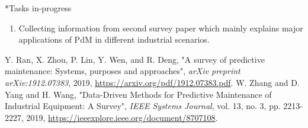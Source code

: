 \documentclass[11pt,a4paper]{article}
\begin{document}
\begin{section}
\begin{subsection}
\begin{enumerate}
    \end{enumerate}
\end{subsection}
\begin{subsection}*{Tasks in-progress}
    \begin{enumerate}
        \item
            Collecting information from second survey paper\cite{survey21} which mainly explains major applications of PdM in different industrial scenarios.
    \end{enumerate}
\end{subsection}
\begin{thebibliography}{9}
    {Y. Ran, X. Zhou, P. Lin, Y. Wen, and R. Deng},
    "A survey of predictive maintenance: Systems, purposes and approaches",
    \textit{arXiv preprint arXiv:1912.07383},
    2019,
    \href{https://arxiv.org/pdf/1912.07383.pdf}{https://arxiv.org/pdf/1912.07383.pdf}.
    {W. {Zhang} and D. {Yang} and H. {Wang}},
    "Data-Driven Methods for Predictive Maintenance of Industrial Equipment: A Survey",
    \textit{IEEE Systems Journal},
    vol. 13,
    no. 3,
    pp. 2213-2227,
    2019,
    \href{https://ieeexplore.ieee.org/document/8707108}{https://ieeexplore.ieee.org/document/8707108}.

    \end{thebibliography}
\end{section}

\newpage
\end{document}
